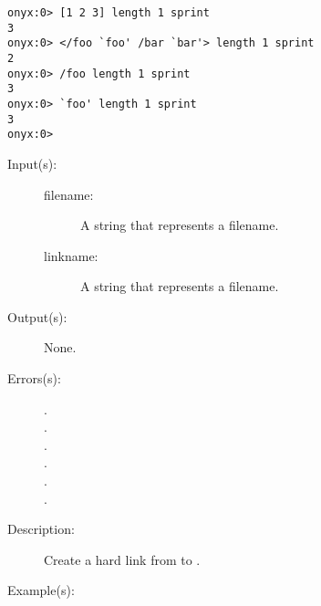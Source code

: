 \begin{description}
\begin{description}
\begin{verbatim}
onyx:0> [1 2 3] length 1 sprint
3
onyx:0> </foo `foo' /bar `bar'> length 1 sprint
2
onyx:0> /foo length 1 sprint
3
onyx:0> `foo' length 1 sprint
3
onyx:0>
		\end{verbatim}
	\end{description}
\label{systemdict:link}
\item[{\onyxop{filename linkname}{link}{--}}: ]
	\begin{description}\item[]
	\item[Input(s): ]
		\begin{description}\item[]
		\item[filename: ]
			A string that represents a filename.
		\item[linkname: ]
			A string that represents a filename.
		\end{description}
	\item[Output(s): ] None.
	\item[Errors(s): ]
		\begin{description}\item[]
		\item[.]
		\item[.]
		\item[.]
		\item[.]
		\item[.]
		\item[.]
		\end{description}
	\item[Description: ]
		Create a hard link from  to .
	\item[Example(s): ]\begin{verbatim}


\end{verbatim}
\end{description}
\end{description}
